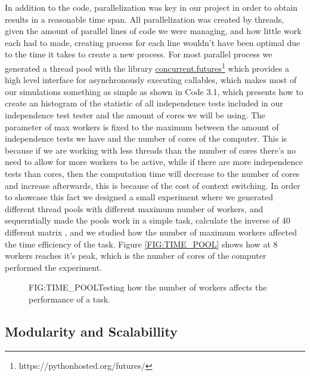 \label{CODE:MEDIAN}

In addition to the code, parallelization was key in our project in order to obtain results in a reasonable time span. All parallelization was created by threads, given the amount of parallel lines of code we were managing, and how little work each had to made, creating process for each line wouldn't have been optimal due to the time it takes to create a new process. 
For most parallel process we generated a thread pool with the library \href{https://pythonhosted.org/futures/}{concurrent.futures}\footnote{https://pythonhosted.org/futures/} which provides a high level interface for asynchronously executing callables, which makes most of our simulations something as simple as shown in Code 3.1, which presents how to create an histogram of the statistic of all independence tests included in our independence test tester and the amount of cores we will be using. The parameter of max workers is fixed to the maximum between the amount of independence tests we have and the number of cores of the computer. This is because if we are working with less threads than the number of cores there's no need to allow for more workers to be active, while if there are more independence tests than cores, then the computation time will decrease to the number of cores and increase afterwards, this is because of the cost of context switching. In order to showcase this fact we designed a small experiment where we generated different thread pools with different maximum number of workers, and sequerntially made the pools work in a simple task, calculate the inverse of 40 different matrix , and we studied how the number of maximum workers affected the time efficiency of the task. Figure \ref{FIG:TIME_POOL} shows how at 8 workers reaches it's peak, which is the number of cores of the computer performed the experiment.

\begin{figure}[Time efficience varying the amount of workers]{FIG:TIME_POOL}{Testing how the number of workers affects the performance of a task.}
\end{figure} 
  
\label{CODE:THREADPOOL}

\subsection{Modularity and Scalabillity}

